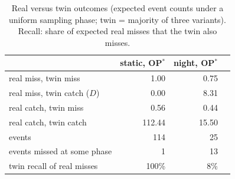 \begin{table}[t]
\centering
\caption{Real versus twin outcomes (expected event counts under a uniform sampling phase; twin = majority of three variants). Recall: share of expected real misses that the twin also misses.}
\label{tab:confusion}
\scriptsize
\setlength{\tabcolsep}{3pt}
\begin{tabular}{@{}lrrr@{}}
\toprule
 & static, OP$^\ast$ & night, OP$^\ast$ \\
\midrule
real miss, twin miss & 1.00 & 0.75 \\
real miss, twin catch ($D$) & 0.00 & 8.31 \\
real catch, twin miss & 0.56 & 0.44 \\
real catch, twin catch & 112.44 & 15.50 \\
\midrule
events & 114 & 25 \\
events missed at some phase & 1 & 13 \\
twin recall of real misses & 100\% & 8\% \\
\bottomrule
\end{tabular}
\end{table}
